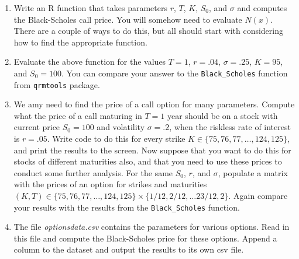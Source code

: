 \documentclass[12pt]{article}
\begin{document}
\begin{enumerate}
\item Write an R function that takes parameters $r$, $T$, $K$,
  $S_0$, and $\sigma$ and computes the Black-Scholes call price. You
  will somehow need to evaluate $N(x)$. There are a couple of ways
  to do this, but all should start with considering how to find the
  appropriate function.
\item Evaluate the above function for the values $T=1$, $r=.04$,
  $\sigma=.25$, $K=95$, and $S_0 = 100$. You can compare your answer
  to the \texttt{Black\_Scholes} function from \texttt{qrmtools} package. 
\item We amy need to find the price of a call option for many parameters.  Compute
  what the price of a call maturing in $T = 1$ year should be on a
  stock with current price $S_0 = 100$ and volatility $\sigma = .2$,
  when the riskless rate of interest is $r = .05$. Write code to do
  this for every strike $K \in \{75, 76, 77, \ldots, 124, 125\}$, and
  print the results to the screen.  Now suppose that you want to do
  this for stocks of different maturities also, and that you need to
  use these prices to conduct some further analysis. For the same
  $S_0$, $r$, and $\sigma$, populate a matrix with the prices of an
  option for strikes and maturities $(K,T) \in \{75, 76, 77, \ldots,
  124, 125\} \times \{1/12, 2/12, \ldots 23/12, 2\}$. Again compare
  your results with the results from the \texttt{Black\_Scholes} function.
\item The file \emph{optionsdata.csv} contains the parameters for various
options. Read in this file and compute the Black-Scholes price for
these options. Append a column to the dataset and output the results
to its own csv file.
\end{enumerate}
\newpage
 
\end{document}
